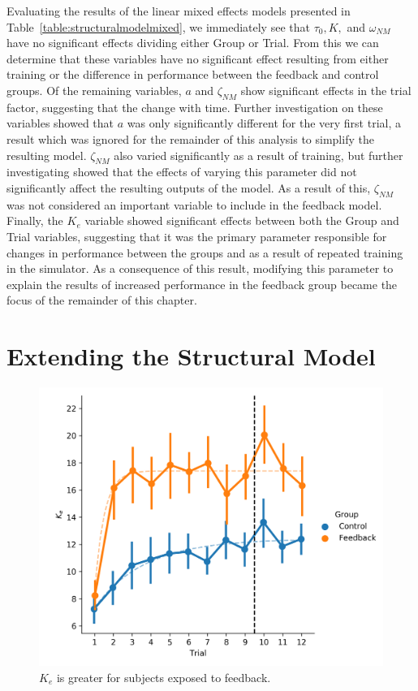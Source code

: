 Evaluating the results of the linear mixed effects models presented in Table~\ref{table:structuralmodelmixed}, we immediately see that $\tau_0, K,$ and $\omega_{NM}$ have no significant effects dividing either Group or Trial.
From this we can determine that these variables have no significant effect resulting from either training or the difference in performance between the feedback and control groups.
Of the remaining variables, $a$ and $\zeta_{NM}$ show significant effects in the trial factor, suggesting that the change with time.
Further investigation on these variables showed that $a$ was only significantly different for the very first trial, a result which was ignored for the remainder of this analysis to simplify the resulting model.
$\zeta_{NM}$ also varied significantly as a result of training, but further investigating showed that the effects of varying this parameter did not significantly affect the resulting outputs of the model.
As a result of this, $\zeta_{NM}$ was not considered an important variable to include in the feedback model.
Finally, the $K_e$ variable showed significant effects between both the Group and Trial variables, suggesting that it was the primary parameter responsible for changes in performance between the groups and as a result of repeated training in the simulator.
As a consequence of this result, modifying this parameter to explain the results of increased performance in the feedback group became the focus of the remainder of this chapter.

\section{Extending the Structural Model}
\begin{figure}[tb]
    \centering
    \includegraphics[width=0.8\linewidth]{figures/Modeling/ke_group.png}
    \caption[$K_e$ is greater for subjects exposed to feedback]{$K_e$ is greater for subjects exposed to feedback.}
    \label{fig:ke_group}
\end{figure}


